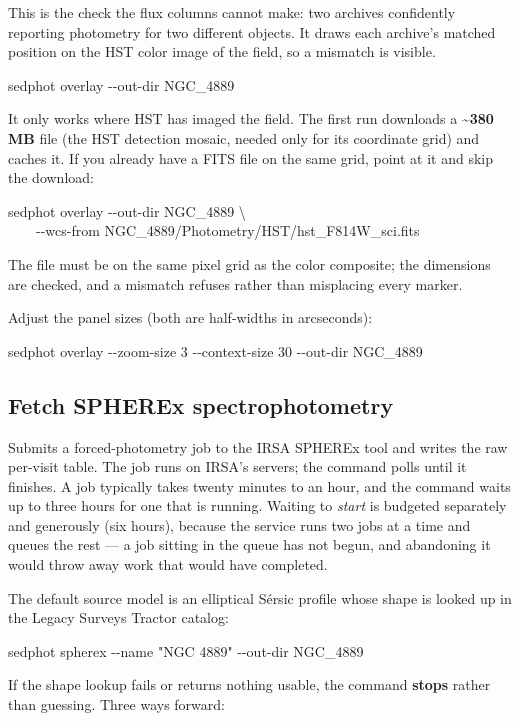 \documentclass[11pt]{article}
\newcommand{\cmdline}[1]{\begin{cmd}\ttfamily #1\end{cmd}}
\begin{document}
This is the check the flux columns cannot make: two archives confidently
reporting photometry for two different objects. It draws each archive's
matched position on the HST color image of the field, so a mismatch is
visible.

\cmdline{sedphot overlay -{}-out-dir NGC\_4889}

It only works where HST has imaged the field. The first run downloads a
\textbf{\textasciitilde380 MB} file (the HST detection mosaic, needed only
for its coordinate grid) and caches it. If you already have a FITS file on
the same grid, point at it and skip the download:

\begin{cmd}\ttfamily\frenchspacing
sedphot overlay -{}-out-dir NGC\_4889 \textbackslash\\
\mbox{}~~~~-{}-wcs-from NGC\_4889/Photometry/HST/hst\_F814W\_sci.fits
\end{cmd}

The file must be on the same pixel grid as the color composite; the
dimensions are checked, and a mismatch refuses rather than misplacing
every marker.

Adjust the panel sizes (both are half-widths in arcseconds):

\cmdline{sedphot overlay -{}-zoom-size 3 -{}-context-size 30 -{}-out-dir NGC\_4889}

\subsection{Fetch SPHEREx spectrophotometry}

Submits a forced-photometry job to the IRSA SPHEREx tool and writes the
raw per-visit table. The job runs on IRSA's servers; the command polls
until it finishes. A job typically takes twenty minutes to an hour, and
the command waits up to three hours for one that is running. Waiting to
\emph{start} is budgeted separately and generously (six hours), because the
service runs two jobs at a time and queues the rest --- a job sitting in the
queue has not begun, and abandoning it would throw away work that would have
completed.

The default source model is an elliptical S\'ersic profile whose shape is
looked up in the Legacy Surveys Tractor catalog:

\cmdline{sedphot spherex -{}-name "NGC 4889" -{}-out-dir NGC\_4889}

If the shape lookup fails or returns nothing usable, the command
\textbf{stops} rather than guessing. Three ways forward:
\end{document}
